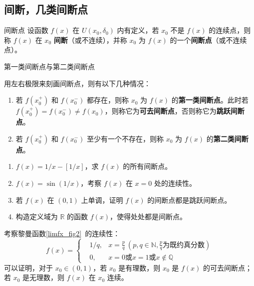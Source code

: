 \subsection{间断，几类间断点}
\begin{definition}{间断点}
  设函数 $f(x)$ 在 $U(x_0,\delta_0)$ 内有定义，若 $x_0$ 不是 $f(x)$ 的连续点，则称 $f(x)$ 在 $x_0$ \textbf{间断}（或不连续），并称 $x_0$ 为 $f(x)$ 的一个\textbf{间断点}（或不连续点）。
\end{definition}
\begin{definition}{第一类间断点与第二类间断点}

用左右极限来刻画间断点，则有以下几种情况：
\begin{enumerate}
\item 若 $f(x_0^+)$ 和 $f(x_0^-)$ 都存在，则称 $x_0$ 为 $f(x)$ 的\textbf{第一类间断点}。此时若 $f(x_0^+)=f(x_0^-)\neq f(x_0)$，则称它为\textbf{可去间断点}，否则称它为\textbf{跳跃间断点}。
\item 若 $f(x_0^+)$ 和 $f(x_0^-)$ 至少有一个不存在，则称 $x_0$ 为 $f(x)$ 的\textbf{第二类间断点}。
\end{enumerate}
\end{definition}

\begin{exercise}{}
\begin{enumerate}
\item $f(x)=1/x-[1/x]$，求 $f(x)$ 的所有间断点。
\item $f(x)=\sin(1/x)$，考察 $f(x)$ 在 $x=0$ 处的连续性。
\item 若 $f(x)$ 在 $(0,1)$ 上单调，证明 $f(x)$ 的间断点都是跳跃间断点。
\item 构造定义域为 $\mathbb{R}$ 的函数 $f(x)$，使得处处都是间断点。 
\end{enumerate}
\end{exercise}
  
考察黎曼函数\autoref{limfx_fig2}~的连续性：
\begin{equation}
f(x)=\left\{
\begin{aligned}
&1/q, &x=\frac{p}{q}\ (p,q\in \mathbb{N}, \frac{p}{q}\text{为既约真分数})\\
&0,&x=0\text{或}x=1\text{或} x\notin \mathbb{Q}
\end{aligned} \right.
\end{equation}
可以证明，对于 $x_0\in(0,1)$，若 $x_0$ 是有理数，则 $x_0$ 是 $f(x)$ 的可去间断点；若 $x_0$ 是无理数，则 $f(x)$ 在 $x_0$ 连续。

